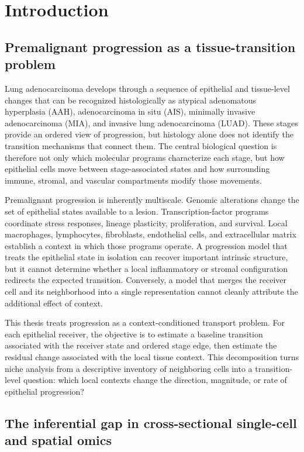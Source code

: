 \chapter{Introduction} \label{chap:introduction}

\section{Premalignant progression as a tissue-transition problem}

Lung adenocarcinoma develops through a sequence of epithelial and tissue-level changes that can be recognized histologically as atypical adenomatous hyperplasia (AAH), adenocarcinoma in situ (AIS), minimally invasive adenocarcinoma (MIA), and invasive lung adenocarcinoma (LUAD). These stages provide an ordered view of progression, but histology alone does not identify the transition mechanisms that connect them. The central biological question is therefore not only which molecular programs characterize each stage, but how epithelial cells move between stage-associated states and how surrounding immune, stromal, and vascular compartments modify those movements.

Premalignant progression is inherently multiscale. Genomic alterations change the set of epithelial states available to a lesion. Transcription-factor programs coordinate stress responses, lineage plasticity, proliferation, and survival. Local macrophages, lymphocytes, fibroblasts, endothelial cells, and extracellular matrix establish a context in which those programs operate. A progression model that treats the epithelial state in isolation can recover important intrinsic structure, but it cannot determine whether a local inflammatory or stromal configuration redirects the expected transition. Conversely, a model that merges the receiver cell and its neighborhood into a single representation cannot cleanly attribute the additional effect of context.

This thesis treats progression as a context-conditioned transport problem. For each epithelial receiver, the objective is to estimate a baseline transition associated with the receiver state and ordered stage edge, then estimate the residual change associated with the local tissue context. This decomposition turns niche analysis from a descriptive inventory of neighboring cells into a transition-level question: which local contexts change the direction, magnitude, or rate of epithelial progression?

\section{The inferential gap in cross-sectional single-cell and spatial omics}


